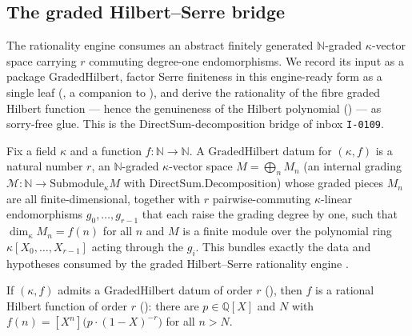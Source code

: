 \subsection{The graded Hilbert--Serre bridge}
\label{subsec:graded_hilbert_bridge}

The rationality engine  consumes an
abstract finitely generated \(\mathbb{N}\)-graded \(\kappa\)-vector space
carrying \(r\) commuting degree-one endomorphisms.  We record its input as a
package \(\mathrm{GradedHilbert}\), factor Serre finiteness in this engine-ready
form as a single leaf (, a companion to
), and derive the rationality of the fibre
graded Hilbert function --- hence the genuineness of the Hilbert polynomial
() --- as sorry-free glue.  This is the
\(\mathrm{DirectSum}\)-decomposition bridge of inbox \texttt{I-0109}.

\begin{definition}
  \label{def:gradedHilbert}
  \leanok
  Fix a field \(\kappa\) and a function \(f : \mathbb{N} \to \mathbb{N}\).  A
  \(\mathrm{GradedHilbert}\) datum for \((\kappa, f)\) is a natural number \(r\),
  an \(\mathbb{N}\)-graded \(\kappa\)-vector space \(M = \bigoplus_n M_n\) (an
  internal grading \(\mathcal{M} : \mathbb{N} \to \mathrm{Submodule}_\kappa M\)
  with \(\mathrm{DirectSum.Decomposition}\)) whose graded pieces \(M_n\) are all
  finite-dimensional, together with \(r\) pairwise-commuting \(\kappa\)-linear
  endomorphisms \(g_0, \dots, g_{r-1}\) that each raise the grading degree by one,
  such that \(\dim_\kappa M_n = f(n)\) for all \(n\) and \(M\) is a finite module
  over the polynomial ring \(\kappa[X_0, \dots, X_{r-1}]\) acting through the
  \(g_i\).  This bundles exactly the data and hypotheses consumed by the graded
  Hilbert--Serre rationality engine .
\end{definition}

\begin{lemma}
  \label{lem:gradedHilbert_isRatHilb}
  \leanok
  If \((\kappa, f)\) admits a \(\mathrm{GradedHilbert}\) datum of order \(r\)
  (), then \(f\) is a rational Hilbert function of order
  \(r\) (): there are \(p \in \mathbb{Q}[X]\) and \(N\) with
  \(f(n) = [X^n]\bigl(p \cdot (1-X)^{-r}\bigr)\) for all \(n > N\).
\end{lemma}


